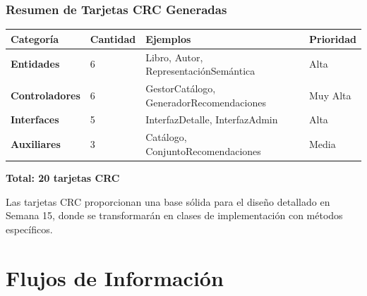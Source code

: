 \documentclass[aspectratio=169]{beamer}
\begin{document}
\begin{frame}
\frametitle{Resumen de Tarjetas CRC Generadas}

\begin{table}
\centering
\tiny
\begin{tabular}{p{2.5cm}p{2cm}p{2cm}p{2cm}}
\toprule
\textbf{Categoría} & \textbf{Cantidad} & \textbf{Ejemplos} & \textbf{Prioridad} \\
\midrule
\textbf{Entidades} & 6 & Libro, Autor, RepresentaciónSemántica & Alta \\
\textbf{Controladores} & 6 & GestorCatálogo, GeneradorRecomendaciones & Muy Alta \\
\textbf{Interfaces} & 5 & InterfazDetalle, InterfazAdmin & Alta \\
\textbf{Auxiliares} & 3 & Catálogo, ConjuntoRecomendaciones & Media \\
\bottomrule
\end{tabular}
\end{table}

\vspace{0.3cm}

\textbf{Total: 20 tarjetas CRC}

\begin{tcolorbox}[colback=green!5, colframe=green!50]
Las tarjetas CRC proporcionan una base sólida para el diseño detallado en Semana 15, donde se transformarán en clases de implementación con métodos específicos.
\end{tcolorbox}

\end{frame}

\section{Flujos de Información}
\end{document}

